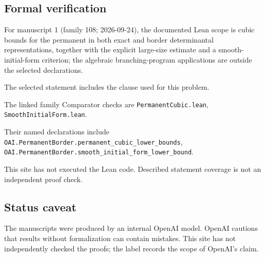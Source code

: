 \documentclass[11pt]{article}
\begin{document}
\subsection{Formal verification}
For manuscript 1 (family 108; 2026-09-24), the documented Lean scope is cubic bounds for the permanent in both exact and border determinantal representations, together with the explicit large-size estimate and a smooth-initial-form criterion; the algebraic branching-program applications are outside the selected declarations.

The selected statement includes the clause used for this problem.

The linked family Comparator checks are \texttt{PermanentCubic.lean}, \texttt{SmoothInitialForm.lean}.

Their named declarations include \texttt{OAI.PermanentBorder.permanent\_cubic\_lower\_bounds}, \texttt{OAI.PermanentBorder.smooth\_initial\_form\_lower\_bound}.

This site has not executed the Lean code. Described statement coverage is not an independent proof check.

\subsection{Status caveat}
The manuscripts were produced by an internal OpenAI model. OpenAI cautions that results without formalization can contain mistakes. This site has not independently checked the proofs; the label records the scope of OpenAI's claim.
\end{document}
